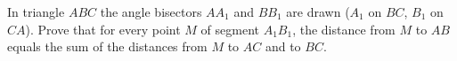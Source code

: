 In triangle $ABC$ the angle bisectors $AA_1$ and $BB_1$ are drawn ($A_1$ on $BC$, $B_1$ on $CA$). Prove that for every point $M$ of segment $A_1B_1$, the distance from $M$ to $AB$ equals the sum of the distances from $M$ to $AC$ and to $BC$.
